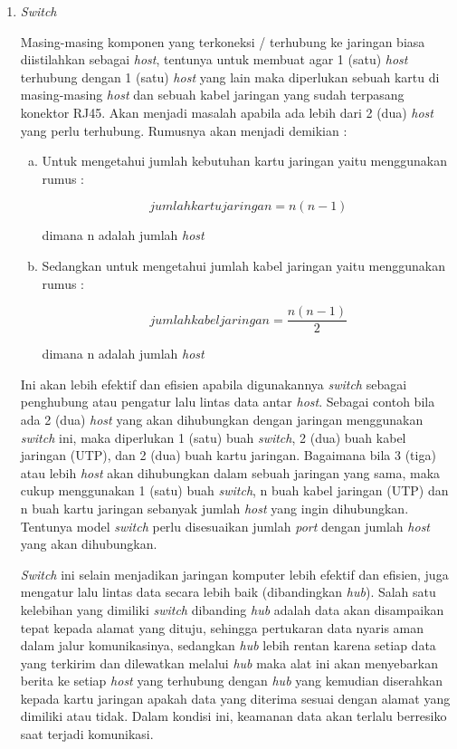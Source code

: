 \documentclass[pdftex,12pt, oneside]{article}
\begin{document}
\begin{enumerate}[1.]
  \item \textit{Switch}
  
Masing-masing komponen yang terkoneksi / terhubung ke jaringan biasa diistilahkan sebagai \textit{host}, tentunya untuk membuat agar 1 (satu) \textit{host} terhubung dengan 1 (satu) \textit{host} yang lain maka diperlukan sebuah kartu di masing-masing \textit{host} dan sebuah kabel jaringan yang sudah terpasang konektor RJ45. Akan menjadi masalah apabila ada lebih dari 2 (dua) \textit{host} yang perlu terhubung. Rumusnya akan menjadi demikian :

\begin{enumerate}[a.]
  \item Untuk mengetahui jumlah kebutuhan kartu jaringan yaitu menggunakan rumus :

\begin{equation}
  jumlah kartu jaringan = n(n-1)
\end{equation}

dimana n adalah jumlah \textit{host}
  
  \item Sedangkan untuk mengetahui jumlah kabel jaringan yaitu menggunakan rumus :
  
\begin{equation}
  jumlah kabel jaringan = \frac{n(n-1)}{2}
\end{equation}
  
dimana n adalah jumlah \textit{host}
\end{enumerate}

Ini akan lebih efektif dan efisien apabila digunakannya \textit{switch} sebagai penghubung atau pengatur lalu lintas data antar \textit{host}. Sebagai contoh bila ada 2 (dua) \textit{host} yang akan dihubungkan dengan jaringan menggunakan \textit{switch} ini, maka diperlukan 1 (satu) buah \textit{switch}, 2 (dua) buah kabel jaringan (UTP), dan 2 (dua) buah kartu jaringan. Bagaimana bila 3 (tiga) atau lebih \textit{host} akan dihubungkan dalam sebuah jaringan yang sama, maka cukup menggunakan 1 (satu) buah \textit{switch}, n buah kabel jaringan (UTP) dan n buah kartu jaringan sebanyak jumlah \textit{host} yang ingin dihubungkan. Tentunya model \textit{switch} perlu disesuaikan jumlah \textit{port} dengan jumlah \textit{host} yang akan dihubungkan.

\textit{Switch} ini selain menjadikan jaringan komputer lebih efektif dan efisien, juga mengatur lalu lintas data secara lebih baik (dibandingkan \textit{hub}). Salah satu kelebihan yang dimiliki \textit{switch} dibanding \textit{hub} adalah data akan disampaikan tepat kepada alamat yang dituju, sehingga pertukaran data nyaris aman dalam jalur komunikasinya, sedangkan \textit{hub} lebih rentan karena setiap data yang terkirim dan dilewatkan melalui \textit{hub} maka alat ini akan menyebarkan berita ke setiap \textit{host} yang terhubung dengan \textit{hub} yang kemudian diserahkan kepada kartu jaringan apakah data yang diterima sesuai dengan alamat yang dimiliki atau tidak. Dalam kondisi ini, keamanan data akan terlalu berresiko saat terjadi komunikasi.


\end{enumerate}
\end{document}
